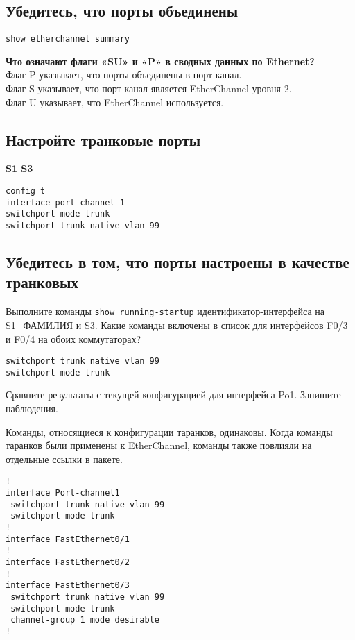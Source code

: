 \subsection{Убедитесь, что порты объединены}

\begin{verbatim}
show etherchannel summary
\end{verbatim}

\textbf{Что означают флаги «SU» и «P» в сводных данных по Ethernet?}\\
Флаг P указывает, что порты объединены в порт-канал.\\
Флаг S указывает, что порт-канал является EtherChannel уровня 2.\\
Флаг U указывает, что EtherChannel используется.\\

\subsection{Настройте транковые порты}

\textbf{S1 S3}

\begin{verbatim}
config t
interface port-channel 1
switchport mode trunk
switchport trunk native vlan 99
\end{verbatim}

\subsection{Убедитесь в том, что порты настроены в качестве транковых}

Выполните команды \verb|show running-startup| идентификатор-интерфейса
на S1\_ФАМИЛИЯ и S3.
Какие команды включены в список для интерфейсов F0/3 и F0/4
на обоих коммутаторах?

\begin{verbatim}
switchport trunk native vlan 99
switchport mode trunk
\end{verbatim}

Сравните результаты с текущей конфигурацией для интерфейса Po1.
Запишите наблюдения.

Команды, относящиеся к конфигурации таранков, одинаковы.
Когда команды таранков были применены к EtherChannel,
команды также повлияли на отдельные ссылки в пакете.

\begin{verbatim}
!
interface Port-channel1
 switchport trunk native vlan 99
 switchport mode trunk
!
interface FastEthernet0/1
!
interface FastEthernet0/2
!
interface FastEthernet0/3
 switchport trunk native vlan 99
 switchport mode trunk
 channel-group 1 mode desirable
!
\end{verbatim}

